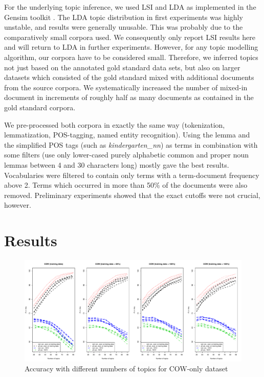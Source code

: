 \documentclass[11pt]{article}
\begin{document}
For the underlying topic inference, we used LSI and LDA as implemented in the Gensim toolkit \cite{RehurekSojka2010}.
The LDA topic distribution in first experiments was highly unstable, and results were generally unusable.
This was probably due to the comparatively small corpora used.
We consequently only report LSI results here and will return to LDA in further experiments.
However, for any topic modelling algorithm, our corpora have to be considered small.
Therefore, we inferred topics not just based on the annotated gold standard data sets, but also on larger datasets which consisted of the gold standard mixed with additional documents from the source corpora.
We systematically increased the number of mixed-in document in increments of roughly half as many documents as contained in the gold standard corpora.

We pre-processed both corpora in exactly the same way (tokenization, lemmatization, POS-tagging, named entity recognition).
Using the lemma and the simplified POS tags (such as \textit{kindergarten\_nn}) as terms in combination with some filters (use only lower-cased purely alphabetic common and proper noun lemmas between 4 and 30 characters long) mostly gave the best results.
Vocabularies were filtered to contain only terms with a term-document frequency above 2.
Terms which occurred in more than 50\% of the documents were also removed.
Preliminary experiments showed that the exact cutoffs were not crucial, however.

\section{Results}
\label{sec:results}

\begin{figure}[h]
  \centering
  \includegraphics[width=\textwidth]{graphics/cow.pdf}
  \caption{Accuracy with different numbers of topics for COW-only dataset}
  \label{fig:cow}
\end{figure}
\end{document}
